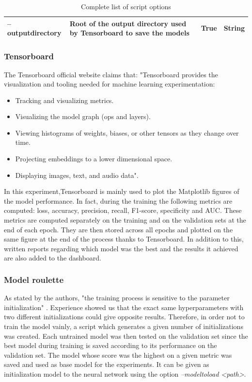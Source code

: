 \begin{table}[]
{\begin{tabular}{|llll|}
\textbf{--outputdirectory}  & Root of the output directory used by Tensorboard to save the models                                                                                                                                                 & True                                                                        & String        \\ \hline
\end{tabular}%
}
\caption{Complete list of script options}
\label{fig:paper_reproduction_options}
\end{table}



\subsubsection{Tensorboard}
The Tensorboard official website \cite{39} claims that: "Tensorboard provides the visualization and tooling needed for machine learning experimentation:
\begin{itemize}
\item Tracking and visualizing metrics.
\item Visualizing the model graph (ops and layers).
\item Viewing histograms of weights, biases, or other tensors as they change over time.
\item Projecting embeddings to a lower dimensional space.
\item Displaying images, text, and audio data"\cite{39}.
\end{itemize}
In this experiment,Tensorboard is mainly used to plot the Matplotlib figures of the model performance. In fact, during the training the following metrics are computed: loss, accuracy, precision, recall, F1-score, specificity and AUC. These metrics are computed separately on the training and on the validation sets at the end of each epoch. They are then stored across all epochs and plotted on the same figure at the end of the process thanks to Tensorboard. In addition to this, written reports regarding which model was the best and the results it achieved are also added to the dashboard.
\label{paper_tensorboard}



\subsubsection{Model roulette}
As stated by the authors, "the training process is sensitive to the parameter initialization" \cite{07}. Experience showed us that the exact same hyperparameters with two different initializations could give opposite results. Therefore, in order not to train the model vainly, a script which generates a given number of initializations was created. Each untrained model was then tested on the validation set since the best model during training is saved according to its performance on the validation set. The model whose score was the highest on a given metric was saved and used as base model for the experiments. It can be given as initialization model to the neural network using the option \textit{--modeltoload <path>}.




